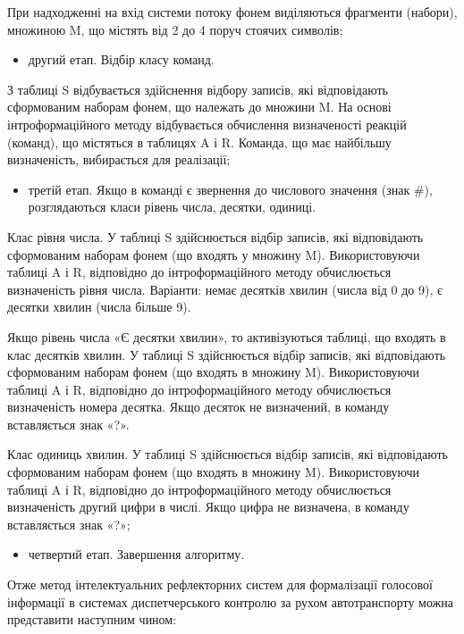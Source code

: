 При надходженні на вхід системи потоку фонем виділяються фрагменти (набори), множиною M, що містять від 2 до 4 поруч стоячих символів;

\begin{itemize}
	\item другий етап. Відбір класу команд.
\end{itemize}

З таблиці S відбувається здійснення відбору записів, які відповідають сформованим наборам фонем, що належать до множини M.
На основі інтроформаційного методу відбувається обчислення визначеності реакцій (команд), що містяться в таблицях A і R. Команда, що має найбільшу визначеність, вибирається для реалізації;

\begin{itemize}
	\item третій етап. Якщо в команді є звернення до числового значення (знак \#), розглядаються класи рівень числа, десятки, одиниці.
\end{itemize}

Клас рівня числа. У таблиці S здійснюється відбір записів, які відповідають сформованим наборам фонем (що входять у множину M). Використовуючи таблиці A і R, відповідно до інтроформаційного методу обчислюється визначеність рівня числа. Варіанти: немає десятків хвилин (числа від 0 до 9), є десятки хвилин (числа більше 9).

Якщо рівень числа «Є десятки хвилин», то активізуються таблиці, що входять в клас десятків хвилин. У таблиці S здійснюється відбір записів, які відповідають сформованим наборам фонем (що входять в множину M). Використовуючи таблиці A і R, відповідно до інтроформаційного методу обчислюється визначеність номера десятка. Якщо десяток не визначений, в команду вставляється знак «?».

Клас одиниць хвилин. У таблиці S здійснюється відбір записів, які відповідають сформованим наборам фонем (що входять в множину M). Використовуючи таблиці A і R, відповідно до інтроформаційного методу обчислюється визначеність другий цифри в числі. Якщо цифра не визначена, в команду вставляється знак «?»;

\begin{itemize}
	\item четвертий етап. Завершення алгоритму.
\end{itemize}

Отже метод інтелектуальних рефлекторних систем для формалізації голосової інформації в системах диспетчерського контролю за рухом автотранспорту можна представити наступним чином:

